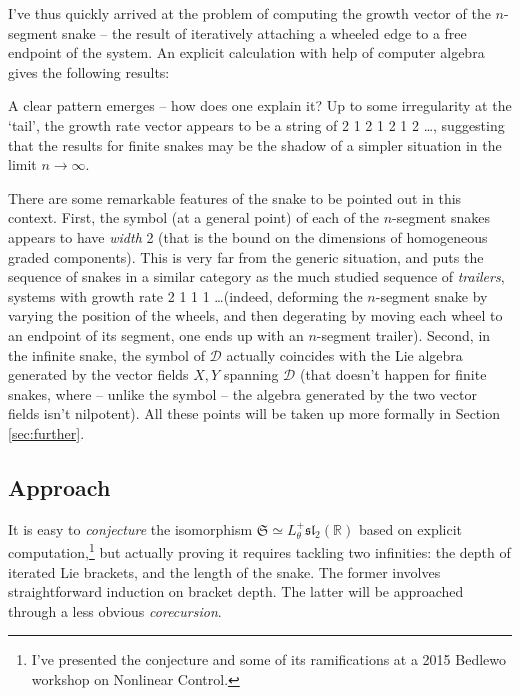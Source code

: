 \documentclass{article}
\def\fsl{\mathfrak{sl}}
\def\fS{\mathfrak{S}}
\def\sD{\mathcal{D}}
\def\RR{\mathbb{R}}
\theoremstyle{definition}
\begin{document}
I've thus quickly arrived at the problem of computing the growth vector of
the $n$-segment snake -- the result of iteratively attaching a wheeled edge  
to a free endpoint of the system. An explicit calculation with help of computer
algebra gives the following results:
\begin{center}\end{center}
A clear pattern emerges -- how does one explain it?
Up to some irregularity at the `tail', the growth rate
vector appears to be a string of 2 1 2 1 2 1 2 \dots,
suggesting that the results for finite snakes may be the shadow
of a simpler situation in the limit $n\to\infty$. 

There are some remarkable features of the snake to be pointed out in this context.
First, the symbol (at a general point) of each of the $n$-segment
snakes appears to have \emph{width} 2 (that is the bound on
the dimensions of homogeneous graded components). This is
very far from the generic situation, and puts the sequence
of snakes in a similar category as the much studied sequence
of \emph{trailers}, systems with growth rate 2 1 1 1 \dots (indeed, deforming the $n$-segment snake
by varying the position of the wheels, and then degerating by moving each wheel to
an endpoint of its segment, one ends up with an $n$-segment trailer). 
Second, in the infinite snake, the symbol of $\sD$ actually coincides with
the Lie algebra generated by the vector fields $X, Y$ spanning $\sD$ (that doesn't
happen for finite snakes, where -- unlike the symbol -- the algebra generated
by the two vector fields isn't nilpotent).
All these points will be taken up more formally in Section \ref{sec:further}.

\subsection{Approach}
It is easy to \emph{conjecture} the isomorphism $\fS \simeq L^+_\theta\fsl_2(\RR)$
based on explicit computation,\footnote{I've presented the conjecture and some of its
ramifications at a 2015 Bedlewo workshop on Nonlinear Control.}
but actually proving it requires tackling two infinities: the depth of iterated Lie brackets,
and the length of the snake.
The former involves straightforward induction on bracket depth.
The latter will be approached through a less obvious \emph{corecursion}.
\end{document}
